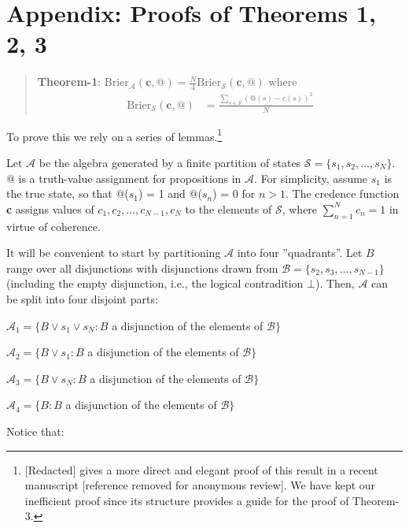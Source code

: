 %
%

\newcommand{\ma}{\mathscr{A}}
\newcommand{\sa}{\mathscr{S}}
\newcommand{\ba}{\mathscr{B}}


\section*{Appendix: Proofs of Theorems 1, 2, 3}
\begin{quote}
\textbf{Theorem-1}: Brier$_{\ma}(\mathbf{c},@) = \frac{N}{4}\text{Brier}_{\sa}(\mathbf{c},@)$ where
\begin{align*}
\text{Brier}_{\sa}(\mathbf{c},@) &= \frac{\sum_{s \in \sa} (@(s) - c(s))^2}{N}
\end{align*}
\end{quote}
To prove this we rely on a series of lemmas.\footnote{[Redacted] gives a more direct and elegant proof of this result in a recent manuscript [reference removed for anonymous review]. We have kept our inefficient proof since its structure provides a guide for the proof of Theorem-3.}

Let $\ma$ be the algebra generated by a finite partition of states $\sa = \{s_1, s_2, \dots, s_N\}$. @ is a truth-value assignment for propositions in $\ma$. For simplicity, assume $s_1$ is the true state, so that @($s_1$) = 1 and @($s_n$) = 0 for $n > 1$. The credence function \textbf{c} assigns values of $c_1, c_2, \dots, c_{N-1}, c_N$  to the elements of $\sa$, where $\sum^{N}_{n=1} c_n = 1$ in virtue of coherence.

It will be convenient to start by partitioning $\ma$ into four ''quadrants''. Let $B$ range over all disjunctions with disjunctions drawn from $\ba = \{s_2, s_3, \dots, s_{N-1}\}$ (including the empty disjunction, i.e., the logical contradition $\bot$). Then, $\ma$ can be split into four disjoint parts:

\begin{itemize*}
\renewcommand\labelitemi{}
\item $\ma_1 = \{B \vee s_1 \vee s_N: B$ a disjunction of the elements of $\ba \}$
\item $\ma_2 = \{B \vee s_1: B$ a disjunction of the elements of $\ba \}$
\item $\ma_3 = \{B \vee s_N: B$ a disjunction of the elements of $\ba \}$
\item $\ma_4 = \{B: B$ a disjunction of the elements of $\ba \}$
\end{itemize*}
Notice that:

